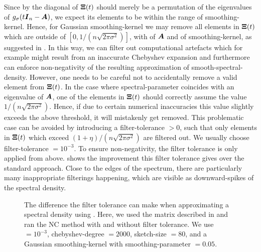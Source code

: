 Since by  the diagonal of $\boldsymbol{\Xi}(t)$
should merely be a permutation of the eigenvalues of $g_{\sigma}(t\boldsymbol{I}_n - \boldsymbol{A})$,
we expect its elements to be within the range of \gls{smoothing-kernel}. Hence,
for Gaussian \gls{smoothing-kernel} we may remove
all elements in $\boldsymbol{\Xi}(t)$ which are outside of $[0, 1 / (n \sqrt{2 \pi \sigma^2})]$,
with  of $\boldsymbol{A}$ and  of \gls{smoothing-kernel},
as suggested in \cite{lin2017randomized}.
In this way, we can filter out computational artefacts which for example might result
from an inaccurate Chebyshev expansion and furthermore 
can enforce non-negativity of the resulting approximation of
\gls{smooth-spectral-density}. However, one needs to be careful not to accidentally
remove a valid element from $\boldsymbol{\Xi}(t)$. In the case where \gls{spectral-parameter}
coincides with an eigenvalue of $\boldsymbol{A}$, one of the elements in $\boldsymbol{\Xi}(t)$
should correctly assume the value $1 / (n \sqrt{2 \pi \sigma^2})$. Hence, if due to
certain numerical inaccuracies this value slightly exceeds the above threshold,
it will mistakenly get removed. This problematic case can be avoided by introducing a
\gls{filter-tolerance} $>0$, such that only elements in $\boldsymbol{\Xi}(t)$ which
exceed $ (1 + \eta) / (n \sqrt{2 \pi \sigma^2})$ are filtered out. We usually
choose \gls{filter-tolerance} $=10^{-3}$. To ensure
non-negativity, the filter tolerance is only applied from above. 
shows the improvement this filter tolerance gives over the standard approach.
Close to the edges of the spectrum, there are particularly many inappropriate
filterings happening, which are visible as downward-spikes of the spectral density.

\begin{figure}[ht]
    \centering
    
    \caption{The difference the filter tolerance can make when approximating
        a spectral density using . 
        Here, we used the matrix described in 
        and ran the \gls{NC} method with and without filter tolerance.
        We use  $= 10^{-3}$,
        \gls{chebyshev-degree} $=2000$, \gls{sketch-size} $=80$, and a
        Gaussian \gls{smoothing-kernel} with \gls{smoothing-parameter} $=0.05$.}
    \label{fig:3-nystrom-filter-tolerance}
\end{figure}

